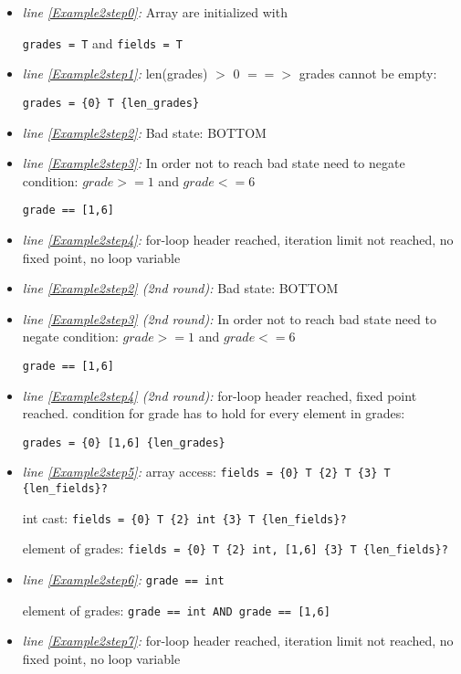 \documentclass[11pt]{article}
\begin{document}
\begin{itemize}

\item \textit{line \ref{Example2step0}:} Array are initialized with 

\verb|grades = T| and \verb|fields = T|

\item \textit{line \ref{Example2step1}:} len(grades) $>$ 0 $==>$ grades cannot be empty:

\verb|grades = {0} T {len_grades}|

\item \textit{line \ref{Example2step2}:} Bad state: BOTTOM

\item \textit{line \ref{Example2step3}:} In order not to reach bad state need to negate condition: $grade >= 1$ and $grade <= 6$

\verb|grade == [1,6]|

\item \textit{line \ref{Example2step4}:} for-loop header reached, iteration limit not reached, no fixed point, no loop variable

\item \textit{line \ref{Example2step2} (2nd round):} Bad state: BOTTOM

\item \textit{line \ref{Example2step3} (2nd round):} In order not to reach bad state need to negate condition: $grade >= 1$ and $grade <= 6$

\verb|grade == [1,6]|

\item \textit{line \ref{Example2step4} (2nd round):} for-loop header reached, fixed point reached. condition for grade has to hold for every element in grades:

\verb|grades = {0} [1,6] {len_grades}|

\item \textit{line \ref{Example2step5}:} array access: \verb|fields = {0} T {2} T {3} T {len_fields}?|

int cast: \verb|fields = {0} T {2} int {3} T {len_fields}?|

element of grades: \verb|fields = {0} T {2} int, [1,6] {3} T {len_fields}?|

\item \textit{line \ref{Example2step6}:} \verb|grade == int|

element of grades: \verb|grade == int AND grade == [1,6]|

\item \textit{line \ref{Example2step7}:} for-loop header reached, iteration limit not reached, no fixed point, no loop variable


\end{itemize}
\end{document}
